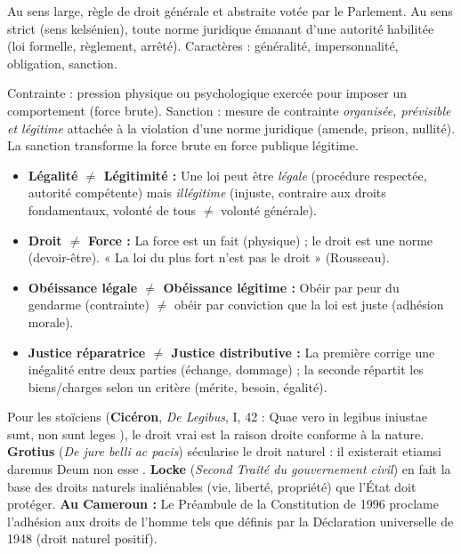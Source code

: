 \documentclass[11pt]{article}
\newcommand{\cle}[1]{{\popxbold\color{popdark}#1}}
\newcounter{popsec}
\newcounter{popsub}
\newcommand{\courssub}[1]{%
  \stepcounter{popsub}%
  \par\vspace{9pt}\noindent{\popxbold\fontsize{11.5}{13}\selectfont\color{popink}{\color{poporange}\thepopsec.\thepopsub}\hspace{6pt}#1}\par\nopagebreak\vspace{4pt}
}
\begin{document}
\begin{definition}[Loi]
Au sens large, règle de droit générale et abstraite votée par le Parlement. Au sens strict (sens kelsénien), toute norme juridique émanant d'une autorité habilitée (loi formelle, règlement, arrêté). Caractères : généralité, impersonnalité, obligation, sanction.
\end{definition}

\begin{definition}
\cle{Contrainte} : pression physique ou psychologique exercée pour imposer un comportement (force brute). \cle{Sanction} : mesure de contrainte \emph{organisée, prévisible et légitime} attachée à la violation d'une norme juridique (amende, prison, nullité). La sanction transforme la force brute en force publique légitime.
\end{definition}

\begin{attention}
\begin{itemize}
    \item \textbf{Légalité $\neq$ Légitimité :} Une loi peut être \emph{légale} (procédure respectée, autorité compétente) mais \emph{illégitime} (injuste, contraire aux droits fondamentaux, volonté de tous $\neq$ volonté générale).
    \item \textbf{Droit $\neq$ Force :} La force est un fait (physique) ; le droit est une norme (devoir-être). « La loi du plus fort n'est pas le droit » (Rousseau).
    \item \textbf{Obéissance légale $\neq$ Obéissance légitime :} Obéir par peur du gendarme (contrainte) $\neq$ obéir par conviction que la loi est juste (adhésion morale).
    \item \textbf{Justice réparatrice $\neq$ Justice distributive :} La première corrige une inégalité entre deux parties (échange, dommage) ; la seconde répartit les biens/charges selon un critère (mérite, besoin, égalité).
\end{itemize}
\end{attention}

\courssub{Les fondements du droit : nature, contrat}
\begin{propriete}
Pour les stoïciens (\textbf{Cicéron}, \emph{De Legibus}, I, 42 : \guillemotleft Quae vero in legibus iniustae sunt, non sunt leges \guillemotright), le droit vrai est la \cle{raison droite} conforme à la nature. \textbf{Grotius} (\emph{De jure belli ac pacis}) sécularise le droit naturel : il existerait \guillemotleft etiamsi daremus Deum non esse \guillemotright. \textbf{Locke} (\emph{Second Traité du gouvernement civil}) en fait la base des \cle{droits naturels inaliénables} (vie, liberté, propriété) que l'État doit protéger. \textbf{Au Cameroun :} Le Préambule de la Constitution de 1996 proclame l'adhésion aux \guillemotleft droits de l'homme tels que définis par la Déclaration universelle de 1948 \guillemotright (droit naturel positif).
\end{propriete}
\end{document}
